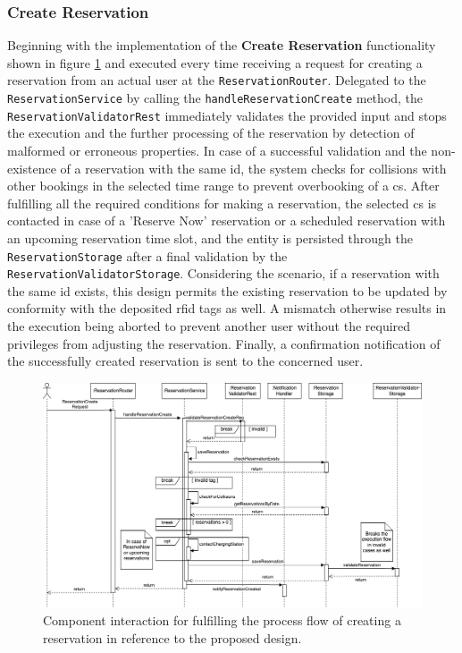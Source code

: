 \subsubsection{Create Reservation}
\label{ch:Implementation:sec:Reservation System:ssec:Management Capabilities:sssec:Create Reservation}

Beginning with the implementation of the \textbf{Create Reservation} functionality shown in figure \ref{fig:create-reservation-seqflow} and executed every time receiving a request for creating a reservation from an actual user at the \texttt{ReservationRouter}. 
Delegated to the \texttt{ReservationService} by calling the \texttt{handleReservationCreate} method, the \texttt{ReservationValidatorRest} immediately validates the provided input and stops the execution and the further processing of the reservation by detection of malformed or erroneous properties.
In case of a successful validation and the non-existence of a reservation with the same \acrshort{id}, the system checks for collisions with other bookings in the selected time range to prevent overbooking of a \acrshort{cs}.
After fulfilling all the required conditions for making a reservation, the selected \acrshort{cs} is contacted in case of a 'Reserve Now' reservation or a scheduled reservation with an upcoming reservation time slot, and the entity is persisted through the \texttt{ReservationStorage} after a final validation by the \texttt{ReservationValidatorStorage}.
Considering the scenario, if a reservation with the same \acrshort{id} exists, this design permits the existing reservation to be updated by conformity with the deposited \acrshort{rfid} tags as well. A mismatch otherwise results in the execution being aborted to prevent another user without the required privileges from adjusting the reservation.
Finally, a confirmation notification of the successfully created reservation is sent to the concerned user.

\begin{figure}[h]
    \centering
    \includegraphics[scale=0.4]{resources/images/main/6_implementation/processes/ReservationCreate.png}
    \caption{Component interaction for fulfilling the process flow of creating a reservation in reference to the proposed design.}
    \label{fig:create-reservation-seqflow}
\end{figure}

